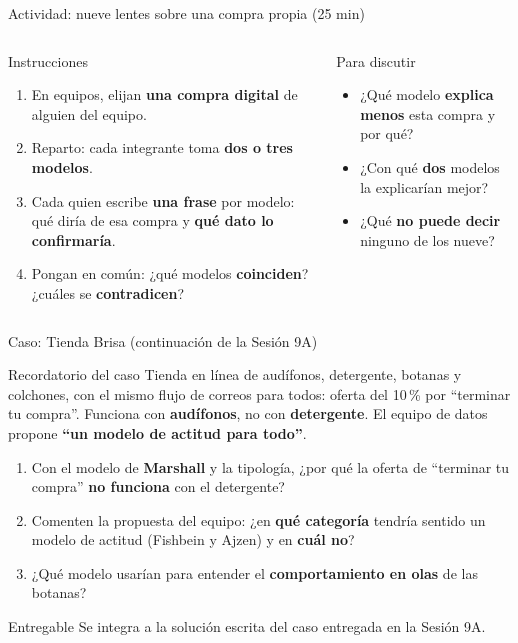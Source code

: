 \documentclass[aspectratio=169,xcolor=dvipsnames]{beamer}
\begin{document}
\begin{frame}{Actividad: nueve lentes sobre una compra propia (25 min)}
\begin{columns}[T]
  \begin{block}{Instrucciones}
    \small
    \begin{enumerate}
      \item En equipos, elijan \textbf{una compra digital} de alguien del equipo.
      \item Reparto: cada integrante toma \textbf{dos o tres modelos}.
      \item Cada quien escribe \textbf{una frase} por modelo: qué diría de esa compra y \textbf{qué dato lo confirmaría}.
      \item Pongan en común: ¿qué modelos \textbf{coinciden}? ¿cuáles se \textbf{contradicen}?
    \end{enumerate}
  \end{block}
  \begin{exampleblock}{Para discutir}
    \small
    \begin{itemize}
      \item ¿Qué modelo \textbf{explica menos} esta compra y por qué?
      \item ¿Con qué \textbf{dos} modelos la explicarían mejor?
      \item ¿Qué \textbf{no puede decir} ninguno de los nueve?
    \end{itemize}
  \end{exampleblock}
\end{columns}
\end{frame}

\begin{frame}{Caso: Tienda Brisa (continuación de la Sesión 9A)}
\begin{exampleblock}{Recordatorio del caso}
  \small Tienda en línea de audífonos, detergente, botanas y colchones, con el mismo flujo de correos para todos: oferta del 10\,\% por \enquote{terminar tu compra}. Funciona con \textbf{audífonos}, no con \textbf{detergente}. El equipo de datos propone \textbf{\enquote{un modelo de actitud para todo}}.
\end{exampleblock}
\begin{enumerate}
  \small
  \item Con el modelo de \textbf{Marshall} y la tipología, ¿por qué la oferta de \enquote{terminar tu compra} \textbf{no funciona} con el detergente?
  \vspace{2pt}
  \item Comenten la propuesta del equipo: ¿en \textbf{qué categoría} tendría sentido un modelo de actitud (Fishbein y Ajzen) y en \textbf{cuál no}?
  \vspace{2pt}
  \item ¿Qué modelo usarían para entender el \textbf{comportamiento en olas} de las botanas?
\end{enumerate}
\begin{alertblock}{Entregable}
  \small Se integra a la solución escrita del caso entregada en la Sesión 9A.
\end{alertblock}
\end{frame}
\end{document}
